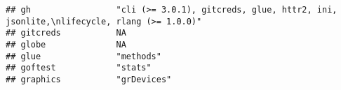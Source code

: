 \documentclass[
]{article}
\begin{document}
\begin{verbatim}
## gh                 "cli (>= 3.0.1), gitcreds, glue, httr2, ini, jsonlite,\nlifecycle, rlang (>= 1.0.0)"                                                                                                                                                                                                                                                                                                                                                         
## gitcreds           NA                                                                                                                                                                                                                                                                                                                                                                                                                                           
## globe              NA                                                                                                                                                                                                                                                                                                                                                                                                                                           
## glue               "methods"                                                                                                                                                                                                                                                                                                                                                                                                                                    
## goftest            "stats"                                                                                                                                                                                                                                                                                                                                                                                                                                      
## graphics           "grDevices"                                                                                                                                                                                                                                                                                                                                                                                                                                  

\end{verbatim}
\end{document}

